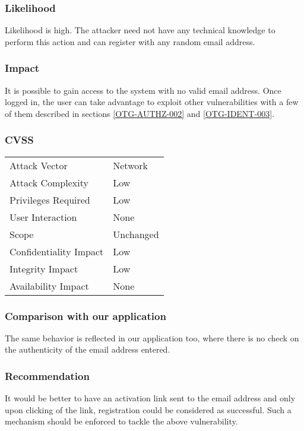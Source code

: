 \subsubsection{Likelihood}
Likelihood is high.
The attacker need not have any technical knowledge to perform this action and can register with any random email address.

\subsubsection{Impact}
It is possible to gain access to the system with no valid email address. Once logged in, the user can take advantage to exploit other vulnerabilities with a few of them described in sections \ref{OTG-AUTHZ-002} and \ref{OTG-IDENT-003}.

\subsubsection{CVSS}
\begin{tabular}{l | l}
Attack Vector		& Network \\
Attack Complexity	& Low \\
Privileges Required & Low \\
User Interaction	& None \\
Scope				& Unchanged \\
Confidentiality Impact		& Low \\
Integrity Impact			& Low \\
Availability Impact		& None
\end{tabular}

\subsubsection{Comparison with our application}
The same behavior is reflected in our application too, where there is no check on the authenticity of the email address entered.

\subsubsection{Recommendation}
It would be better to have an activation link sent to the email address and only upon clicking of the link, registration could be considered as successful. Such a mechanism should be enforced to tackle the above vulnerability.

\clearpage